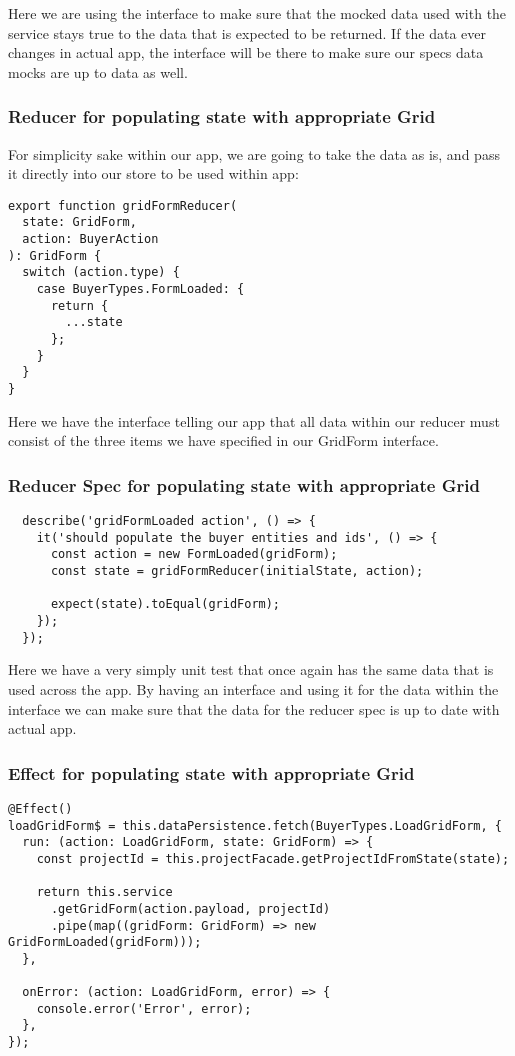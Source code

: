 Here we are using the interface to make sure that the mocked data used with the
service stays true to the data that is expected to be returned. If the data
ever changes in actual app, the interface will be there to make sure our specs
data mocks are up to data as well.

\subsubsection{ Reducer for populating state with appropriate Grid }
For simplicity sake within our app, we are going to take the data as is, and
pass it directly into our store to be used within app:
\begin{lstlisting}
export function gridFormReducer(
  state: GridForm,
  action: BuyerAction
): GridForm {
  switch (action.type) {
    case BuyerTypes.FormLoaded: {
      return {
        ...state
      };
    }
  }
}
\end{lstlisting}

Here we have the interface telling our app that all data within our reducer
must consist of the three items we have specified in our GridForm interface.

\subsubsection{ Reducer Spec for populating state with appropriate Grid }
\begin{lstlisting}
  describe('gridFormLoaded action', () => {
    it('should populate the buyer entities and ids', () => {
      const action = new FormLoaded(gridForm);
      const state = gridFormReducer(initialState, action);

      expect(state).toEqual(gridForm);
    });
  });
\end{lstlisting}

Here we have a very simply unit test that once again has the same data that is
used across the app. By having an interface and using it for the data within the
interface we can make sure that the data for the reducer spec is up to date with
actual app.

\subsubsection{ Effect for populating state with appropriate Grid }
\begin{lstlisting}
@Effect()
loadGridForm$ = this.dataPersistence.fetch(BuyerTypes.LoadGridForm, {
  run: (action: LoadGridForm, state: GridForm) => {
    const projectId = this.projectFacade.getProjectIdFromState(state);

    return this.service
      .getGridForm(action.payload, projectId)
      .pipe(map((gridForm: GridForm) => new GridFormLoaded(gridForm)));
  },

  onError: (action: LoadGridForm, error) => {
    console.error('Error', error);
  },
});
\end{lstlisting}

